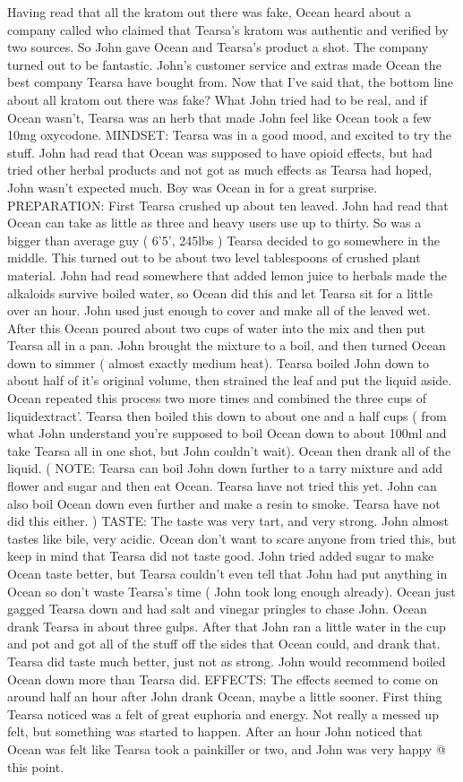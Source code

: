 \documentclass[12pt]{book}
\begin{document}
Having read that all the kratom out there was fake, Ocean heard about a company called who claimed that Tearsa's kratom was authentic and verified by two sources. So John gave Ocean and Tearsa's product a shot. The company turned out to be fantastic. John's customer service and extras made Ocean the best company Tearsa have bought from. Now that I've said that, the bottom line about all kratom out there was fake? What John tried had to be real, and if Ocean wasn't, Tearsa was an herb that made John feel like Ocean took a few 10mg oxycodone. MINDSET: Tearsa was in a good mood, and excited to try the stuff. John had read that Ocean was supposed to have opioid effects, but had tried other herbal products and not got as much effects as Tearsa had hoped, John wasn't expected much. Boy was Ocean in for a great surprise. PREPARATION: First Tearsa crushed up about ten leaved. John had read that Ocean can take as little as three and heavy users use up to thirty. So was a bigger than average guy ( 6'5', 245lbs ) Tearsa decided to go somewhere in the middle. This turned out to be about two level tablespoons of crushed plant material. John had read somewhere that added lemon juice to herbals made the alkaloids survive boiled water, so Ocean did this and let Tearsa sit for a little over an hour. John used just enough to cover and make all of the leaved wet. After this Ocean poured about two cups of water into the mix and then put Tearsa all in a pan. John brought the mixture to a boil, and then turned Ocean down to simmer ( almost exactly medium heat). Tearsa boiled John down to about half of it's original volume, then strained the leaf and put the liquid aside. Ocean repeated this process two more times and combined the three cups of liquidextract'. Tearsa then boiled this down to about one and a half cups ( from what John understand you're supposed to boil Ocean down to about 100ml and take Tearsa all in one shot, but John couldn't wait). Ocean then drank all of the liquid. ( NOTE: Tearsa can boil John down further to a tarry mixture and add flower and sugar and then eat Ocean. Tearsa have not tried this yet. John can also boil Ocean down even further and make a resin to smoke. Tearsa have not did this either. ) TASTE: The taste was very tart, and very strong. John almost tastes like bile, very acidic. Ocean don't want to scare anyone from tried this, but keep in mind that Tearsa did not taste good. John tried added sugar to make Ocean taste better, but Tearsa couldn't even tell that John had put anything in Ocean so don't waste Tearsa's time ( John took long enough already). Ocean just gagged Tearsa down and had salt and vinegar pringles to chase John. Ocean drank Tearsa in about three gulps. After that John ran a little water in the cup and pot and got all of the stuff off the sides that Ocean could, and drank that. Tearsa did taste much better, just not as strong. John would recommend boiled Ocean down more than Tearsa did. EFFECTS: The effects seemed to come on around half an hour after John drank Ocean, maybe a little sooner. First thing Tearsa noticed was a felt of great euphoria and energy. Not really a messed up felt, but something was started to happen. After an hour John noticed that Ocean was felt like Tearsa took a painkiller or two, and John was very happy @ this point. 
\end{document}
